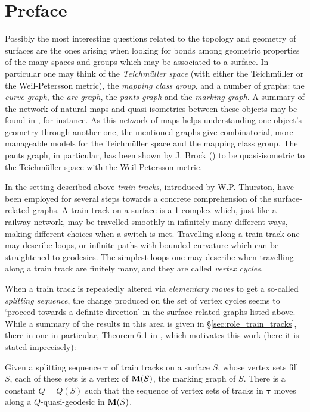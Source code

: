 \chapter*{Preface}

Possibly the most interesting questions related to the topology and geometry of surfaces are the ones arising when looking for bonds among geometric properties of the many spaces and groups which may be associated to a surface. In particular one may think of the \emph{Teichm\"uller space} (with either the Teichm\"uller or the Weil-Petersson metric), the \emph{mapping class group}, and a number of graphs: the \emph{curve graph}, the \emph{arc graph}, the \emph{pants graph} and the \emph{marking graph}. A summary of the network of natural maps and quasi-isometries between these objects may be found in \cite{duchin}, for instance. As this network of maps helps understanding one object's geometry through another one, the mentioned graphs give combinatorial, more manageable models for the Teichm\"uller space and the mapping class group. The pants graph, in particular, has been shown by J. Brock (\cite{brock1}) to be quasi-isometric to the Teichm\"uller space with the Weil-Petersson metric.

In the setting described above \emph{train tracks}, introduced by W.P. Thurston, have been employed for several steps towards a concrete comprehension of the surface-related graphs. A train track on a surface is a 1-complex which, just like a railway network, may be travelled smoothly in infinitely many different ways, making different choices when a switch is met. Travelling along a train track one may describe loops, or infinite paths with bounded curvature which can be straightened to geodesics. The simplest loops one may describe when travelling along a train track are finitely many, and they are called \emph{vertex cycles}.

When a train track is repeatedly altered via \emph{elementary moves} to get a so-called \emph{splitting sequence}, the change produced on the set of vertex cycles seems to `proceed towards a definite direction' in the surface-related graphs listed above. While a summary of the results in this area is given in \S \ref{sec:role_train_tracks}, there in one in particular, Theorem 6.1 in \cite{mms}, which motivates this work (here it is stated imprecisely):
\begin{theono}
Given a splitting sequence $\bm\tau$ of train tracks on a surface $S$, whose vertex sets fill $S$, each of these sets is a vertex of $\mathbf M(S)$, the marking graph of $S$. There is a constant $Q=Q(S)$ such that the sequence of vertex sets of tracks in $\bm\tau$ moves along a $Q$-quasi-geodesic in $\mathbf M(S)$.
\end{theono}

